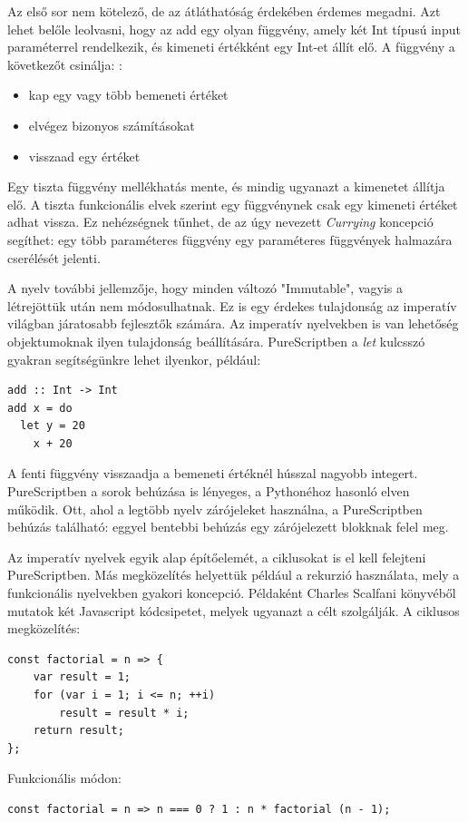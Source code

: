 \documentclass[12pt]{article}
\begin{document}
Az első sor nem kötelező,  de az átláthatóság érdekében érdemes megadni.  Azt lehet belőle leolvasni,  hogy az add egy olyan függvény,  amely két Int típusú input paraméterrel rendelkezik,  és kimeneti értékként egy Int-et állít elő. A függvény a következőt csinálja: \cite{CS}:
\begin{itemize}
\item kap egy vagy több bemeneti értéket
\item elvégez bizonyos számításokat
\item visszaad egy értéket
\end{itemize}
Egy tiszta függvény mellékhatás mente, és mindig ugyanazt a kimenetet állítja elő\cite{CS}.  A tiszta funkcionális elvek szerint egy függvénynek csak egy kimeneti értéket adhat vissza. Ez nehézségnek tűnhet, de az úgy nevezett \textit{Currying} koncepció segíthet: egy több paraméteres függvény egy paraméteres függvények halmazára cserélését jelenti.

A nyelv további jellemzője, hogy minden változó "Immutable", vagyis a létrejöttük után nem módosulhatnak. Ez is egy érdekes tulajdonság az imperatív világban járatosabb fejlesztők számára.  Az imperatív nyelvekben is van lehetőség objektumoknak ilyen tulajdonság beállítására.  PureScriptben a \textit{let} kulcsszó gyakran segítségünkre lehet ilyenkor, például:

\begin{verbatim}
add :: Int -> Int
add x = do
  let y = 20
    x + 20
\end{verbatim}
A fenti függvény visszaadja a bemeneti értéknél hússzal nagyobb integert. PureScriptben a sorok behúzása is lényeges, a Pythonéhoz hasonló elven működik. Ott, ahol a legtöbb nyelv zárójeleket használna, a PureScriptben behúzás található: eggyel bentebbi behúzás egy zárójelezett blokknak felel meg.

Az imperatív nyelvek egyik alap építőelemét, a ciklusokat is el kell felejteni PureScriptben. Más megközelítés helyettük például a rekurzió használata, mely a funkcionális nyelvekben gyakori koncepció. Példaként Charles Scalfani könyvéből \cite{CS} mutatok két Javascript kódcsipetet, melyek ugyanazt a célt szolgálják. 
A ciklusos megközelítés:

\begin{verbatim}
const factorial = n => {
    var result = 1;
    for (var i = 1; i <= n; ++i)
        result = result * i;
    return result;
};
\end{verbatim}

Funkcionális módon:
\begin{verbatim}
const factorial = n => n === 0 ? 1 : n * factorial (n - 1);
\end{verbatim}
\end{document}
